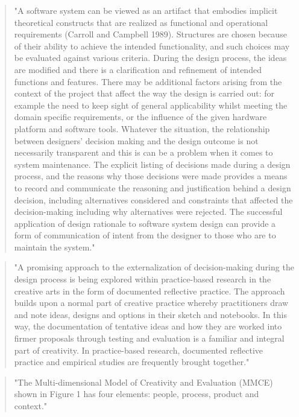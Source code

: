 \begin{quote}
  "A software system can be viewed as an artifact that embodies implicit theoretical constructs that are realized as functional and operational requirements (Carroll and Campbell 1989). Structures are chosen because of their ability to achieve the intended functionality, and such choices may be evaluated against various criteria. During the design process, the ideas are modified and there is a clarification and refinement of intended functions and features. There may be additional factors arising from the context of the project that affect the way the design is carried out: for example the need to keep sight of general applicability whilst meeting the domain specific requirements, or the influence of the given hardware platform and software tools. Whatever the situation, the relationship between designers' decision making and the design outcome is not necessarily transparent and this is can be a problem when it comes to system maintenance. The explicit listing of decisions made during a design process, and the reasons why those decisions were made provides a means to record and communicate the reasoning and justification behind a design decision, including alternatives considered and constraints that affected the decision-making including why alternatives were rejected. The successful application of design rationale to software system design can provide a form of communication of intent from the designer to those who are to maintain the system." \citep[p.9]{Candy2012}
\end{quote}

\begin{quote}
  "A promising approach to the externalization of decision-making during the design process is being explored within practice-based research in the creative arts in the form of documented reflective practice. The approach builds upon a normal part of creative practice whereby practitioners draw and note ideas, designs and options in their sketch and notebooks. In this way, the documentation of tentative ideas and how they are worked into firmer proposals through testing and evaluation is a familiar and integral part of creativity. In practice-based research, documented reflective practice and empirical studies are frequently brought together." \citep[p.10]{Candy2012}
\end{quote}

\begin{quote}
  "The Multi-dimensional Model of Creativity and Evaluation (MMCE) shown in Figure 1 has four elements: people, process, product and context." \citep[p.11]{Candy2012}
\end{quote}

